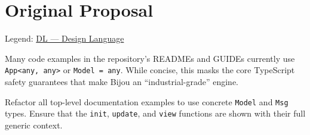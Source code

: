 \section{Original Proposal}\label{record-300-original-proposal}

Legend: \href{https://github.com/flyingrobots/bijou/blob/1853ad902f6bf219326409e7f743a5a1d6517dbc/docs/method/legends/DL-design-language.md}{DL --- Design Language}

Many code examples in the repository's READMEs and GUIDEs currently use \texttt{A\allowbreak{}p\allowbreak{}p\allowbreak{}<\allowbreak{}a\allowbreak{}n\allowbreak{}y\allowbreak{},\allowbreak{} \allowbreak{}a\allowbreak{}n\allowbreak{}y\allowbreak{}>} or \texttt{M\allowbreak{}o\allowbreak{}d\allowbreak{}e\allowbreak{}l\allowbreak{} \allowbreak{}=\allowbreak{} \allowbreak{}a\allowbreak{}n\allowbreak{}y}. While concise, this masks the core TypeScript safety guarantees that make Bijou an ``industrial-grade'' engine.

Refactor all top-level documentation examples to use concrete \texttt{M\allowbreak{}o\allowbreak{}d\allowbreak{}e\allowbreak{}l} and \texttt{M\allowbreak{}s\allowbreak{}g} types. Ensure that the \texttt{i\allowbreak{}n\allowbreak{}i\allowbreak{}t}, \texttt{u\allowbreak{}p\allowbreak{}d\allowbreak{}a\allowbreak{}t\allowbreak{}e}, and \texttt{v\allowbreak{}i\allowbreak{}e\allowbreak{}w} functions are shown with their full generic context.

